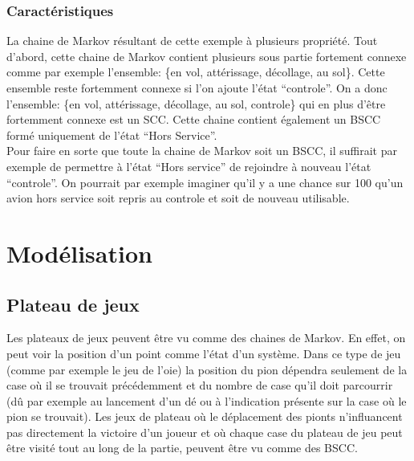 \documentclass[letterpaper]{article}
\begin{document}
    \subsubsection{Caractéristiques}
      La chaine de Markov résultant de cette exemple à plusieurs propriété.  Tout
      d'abord, cette chaine de Markov contient plusieurs sous partie fortement
      connexe comme par exemple l'ensemble: \{en vol, attérissage, décollage,
      au sol\}.  Cette ensemble reste fortemment connexe si l'on ajoute l'état
      ``controle''.  On a donc l'ensemble: \{en vol, attérissage, décollage,
      au sol, controle\} qui en plus d'être fortemment connexe est un SCC.
      Cette chaine contient également un BSCC formé uniquement de l'état 
      ``Hors Service''.\\
      Pour faire en sorte que toute la chaine de Markov soit un BSCC, il suffirait
      par exemple de permettre à l'état ``Hors service'' de rejoindre à nouveau l'état
      ``controle''.  On pourrait par exemple imaginer qu'il y a une chance sur 100 qu'un
      avion hors service soit repris au controle et soit de nouveau utilisable.
      
\section{Modélisation}

  \subsection{Plateau de jeux}
    Les plateaux de jeux peuvent être vu comme des chaines de Markov.  En effet, on peut 
    voir la position d'un point comme l'état d'un système.  Dans ce type de jeu (comme 
    par exemple le jeu de l'oie) la position du pion dépendra seulement de la case où il 
    se trouvait précédemment et du nombre de case qu'il doit parcourrir (dû par exemple 
    au lancement d'un dé ou à l'indication présente sur la case où le pion se trouvait).
    Les jeux de plateau où le déplacement des pionts n'influancent pas directement la 
    victoire d'un joueur et où chaque case du plateau de jeu peut être visité tout 
    au long de la partie, peuvent être vu comme des BSCC.  
  
\end{document}
